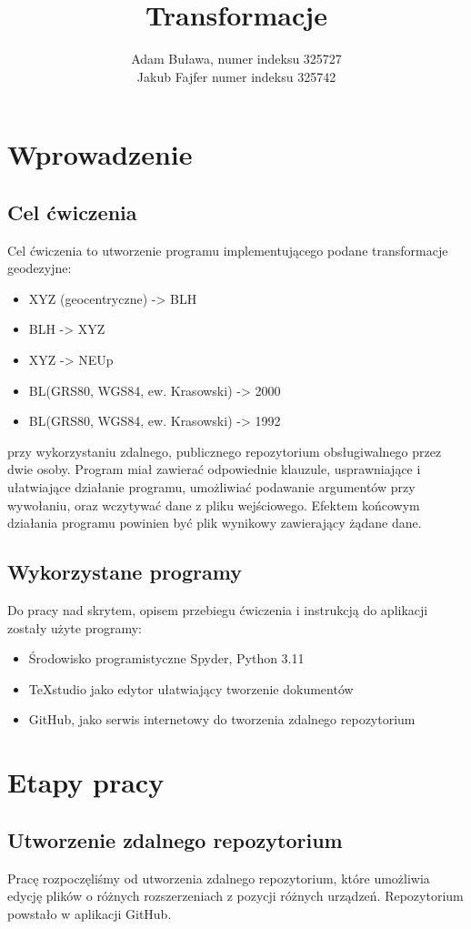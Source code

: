 \documentclass[10pt,a4paper]{article}
\title{Transformacje}
\author{Adam Buława, numer indeksu 325727 \\ Jakub Fajfer numer indeksu 325742}
\begin{document}
\tableofcontents
\newpage	
\section{Wprowadzenie}

\subsection{Cel ćwiczenia}
Cel ćwiczenia to utworzenie programu implementującego podane transformacje geodezyjne:
\begin{itemize}
	\item XYZ (geocentryczne) -> BLH
	\item  BLH -> XYZ 
	\item  XYZ -> NEUp
	\item  BL(GRS80, WGS84, ew. Krasowski) -> 2000 
	\item  BL(GRS80, WGS84, ew. Krasowski) -> 1992
\end{itemize}
przy wykorzystaniu zdalnego, publicznego repozytorium obsługiwalnego przez dwie osoby. Program miał zawierać odpowiednie klauzule, usprawniające i ułatwiające działanie programu, umożliwiać podawanie argumentów przy wywołaniu, oraz wczytywać dane z pliku wejściowego. Efektem końcowym działania programu powinien być plik wynikowy zawierający żądane dane.
\subsection{Wykorzystane programy}
Do pracy nad skrytem, opisem przebiegu ćwiczenia i instrukcją do aplikacji zostały użyte programy:
\begin{itemize}
	\item Środowisko programistyczne Spyder, Python 3.11
	\item TeXstudio jako edytor ułatwiający tworzenie dokumentów
	\item GitHub, jako serwis internetowy do tworzenia zdalnego repozytorium
\end{itemize}
\section{Etapy pracy}
\subsection{Utworzenie zdalnego repozytorium}
Pracę rozpoczęliśmy od utworzenia zdalnego repozytorium, które umożliwia edycję plików o różnych rozszerzeniach z pozycji różnych urządzeń. Repozytorium powstało w aplikacji GitHub.
\end{document}
